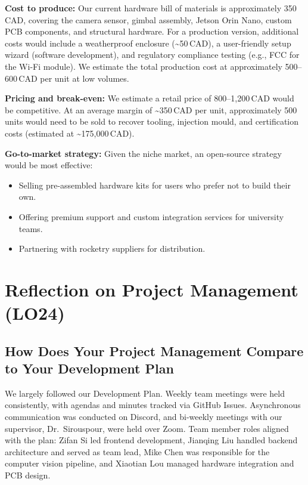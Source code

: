 \documentclass{article}
\begin{document}
\textbf{Cost to produce:} Our current hardware bill of materials is
approximately 350\,CAD, covering the camera sensor, gimbal assembly, Jetson Orin
Nano, custom PCB components, and structural hardware. For a production version,
additional costs would include a weatherproof enclosure (\textasciitilde50\,CAD),
a user-friendly setup wizard (software development), and regulatory compliance
testing (e.g., FCC for the Wi-Fi module). We estimate the total production cost
at approximately 500--600\,CAD per unit at low volumes.

\textbf{Pricing and break-even:} We estimate a retail price of 800--1{,}200\,CAD
would be competitive. At an average margin of \textasciitilde350\,CAD per unit,
approximately 500 units would need to be sold to recover tooling, injection
mould, and certification costs (estimated at \textasciitilde175{,}000\,CAD).

\textbf{Go-to-market strategy:} Given the niche market, an open-source strategy
would be most effective:
\begin{itemize}
  \item Selling pre-assembled hardware kits for users who prefer not to build their
        own.
  \item Offering premium support and custom integration services for university teams.
  \item Partnering with rocketry suppliers for distribution.
\end{itemize}

\section{Reflection on Project Management (LO24)}

\subsection{How Does Your Project Management Compare to Your Development Plan}

We largely followed our Development Plan. Weekly team meetings were held
consistently, with agendas and minutes tracked via GitHub Issues. Asynchronous
communication was conducted on Discord, and bi-weekly meetings with our
supervisor, Dr.~Sirouspour, were held over Zoom. Team member roles aligned with
the plan: Zifan Si led frontend development, Jianqing Liu handled backend
architecture and served as team lead, Mike Chen was responsible for the
computer vision pipeline, and Xiaotian Lou managed hardware integration and PCB
design.
\end{document}
